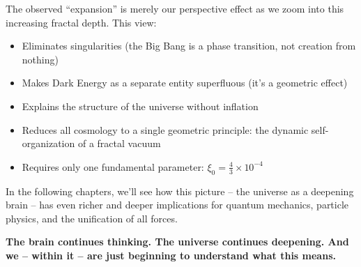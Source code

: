 The observed ``expansion'' is merely our perspective effect as we zoom into this increasing fractal depth. This view:

\begin{itemize}[leftmargin=*]
\item Eliminates singularities (the Big Bang is a phase transition, not creation from nothing)
\item Makes Dark Energy as a separate entity superfluous (it's a geometric effect)
\item Explains the structure of the universe without inflation
\item Reduces all cosmology to a single geometric principle: the dynamic self-organization of a fractal vacuum
\item Requires only one fundamental parameter: $\xi_0 = \frac{4}{3} \times 10^{-4}$
\end{itemize}

In the following chapters, we'll see how this picture -- the universe as a deepening brain -- has even richer and deeper implications for quantum mechanics, particle physics, and the unification of all forces.

\textbf{The brain continues thinking. The universe continues deepening. And we -- within it -- are just beginning to understand what this means.}



